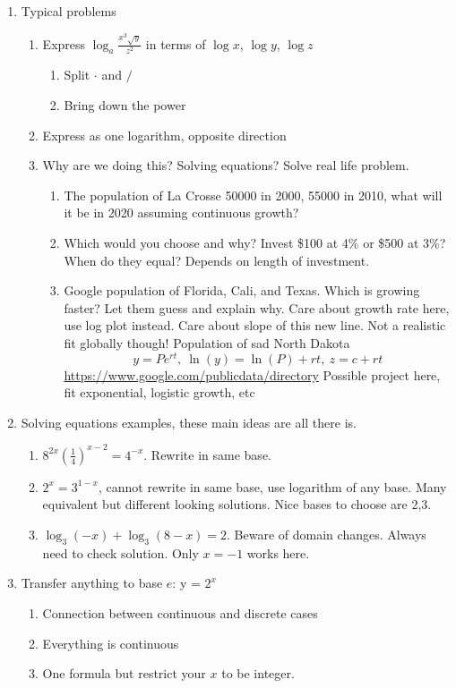 \documentclass{article}
\begin{document}
\begin{enumerate}
\item Typical problems
\begin{enumerate}
\item Express $\log_a \frac{x^3\sqrt{y}}{z^2}$ in terms of $\log x$, $\log y $, $\log z$
\begin{enumerate}
\item Split $\cdot$ and $/$
\item Bring down the power
\end{enumerate}
\item Express as one logarithm, opposite direction
\item Why are we doing this? Solving equations? Solve real life problem.
\begin{enumerate}
\item The population of La Crosse 50000 in 2000, 55000 in 2010, what will it be in 2020 assuming continuous growth? 
\item Which would you choose and why? Invest \$100 at 4\% or \$500 at 3\%? When do they equal? Depends on length of investment.
\item Google population of Florida, Cali, and Texas. Which is growing faster? Let them guess and explain why. Care about growth rate here, use log plot instead. Care about slope of this new line. Not a realistic fit globally though! Population of sad North Dakota
$$
y = Pe^{rt}, ~ \ln(y) = \ln(P)+rt, ~ z = c + rt
$$
\url{https://www.google.com/publicdata/directory} Possible project here, fit exponential, logistic growth, etc
\end{enumerate}
\end{enumerate}

\item Solving equations examples, these main ideas are all there is.
\begin{enumerate}
\item $8^{2x}(\frac{1}{4})^{x-2} = 4^{-x}$. Rewrite in same base.
\item $2^x = 3^{1-x}$, cannot rewrite in same base, use logarithm of any base. Many equivalent but different looking solutions. Nice bases to choose are 2,3.
\item $\log_3(-x) + \log_3(8-x) = 2$. Beware of domain changes. Always need to check solution. Only $x=-1$ works here.
\end{enumerate}

\item Transfer anything to base $e$: y = $2^x$
\begin{enumerate}
\item Connection between continuous and discrete cases
\item Everything is continuous
\item One formula but restrict your $x$ to be integer.


\end{enumerate}
\end{enumerate}
\end{document}
